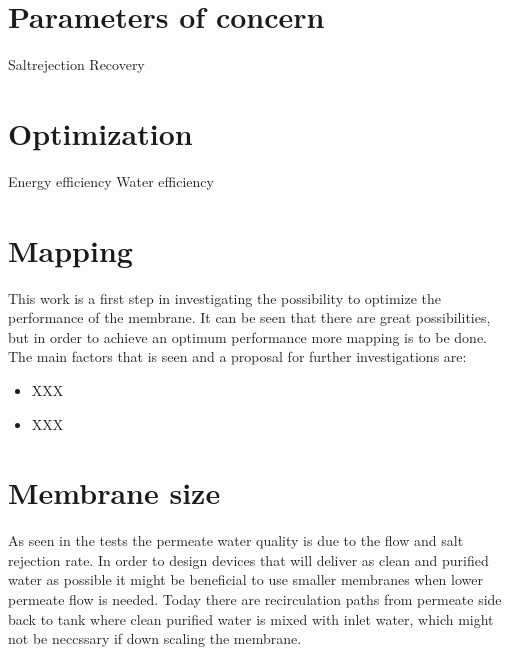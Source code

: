 
\section{Parameters of concern}
Saltrejection
Recovery


\section{Optimization}

Energy efficiency
Water efficiency



\section{Mapping}
This work is a first step in investigating the possibility to optimize the performance of the membrane. It can be seen that there are great possibilities, but in order to achieve an optimum performance more mapping is to be done. The main factors that is seen and a proposal for further investigations are:

\begin{itemize}
\item XXX
\item XXX
\end{itemize}


\section{Membrane size}
As seen in the tests the permeate water quality is due to the flow and salt rejection rate. In order to design devices that will deliver as clean and purified water as possible it might be beneficial to use smaller membranes when lower permeate flow is needed. Today there are recirculation paths from permeate side back to tank where clean purified water is mixed with inlet water, which might not be neccssary if down scaling the membrane.








